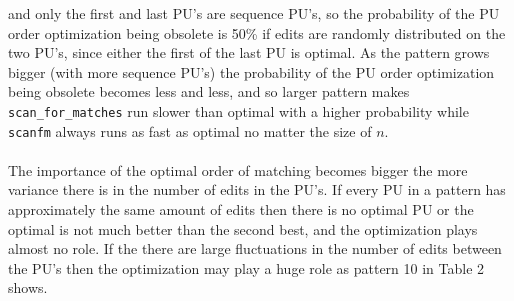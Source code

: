 \documentclass[12pt]{article}
\newcommand{\scm}{\texttt{scan\_for\_matches} }
\newcommand{\sfm}{\texttt{scanfm} }
\newcommand{\pu}{PU }
\newcommand{\pus}{PU's }
\newcommand{\pusp}{PU's. }
\begin{document}
and only the first and last \pus are sequence PU's, so the probability of the \pu order optimization being obsolete
is 50\% if edits are randomly distributed on the two PU's, 
since either the first of the last \pu is optimal. As the pattern grows bigger (with more sequence PU's) the
probability of the \pu order optimization being obsolete becomes less and less, and so larger pattern
makes \scm run slower than optimal with a higher probability while \sfm always runs as fast as optimal no matter the size
of $n$. \\ \\
The importance of the optimal order of matching becomes bigger the more variance there is in the number of edits in the
\pusp If every \pu in a pattern has approximately the same amount of edits then there is no optimal \pu or the optimal
is not much better than the second best, and the optimization plays almost no role. If the there are large fluctuations
in the number of edits between the \pus then the optimization may play a huge role as pattern 10 in Table 2 shows. \\ \\
\end{document}

